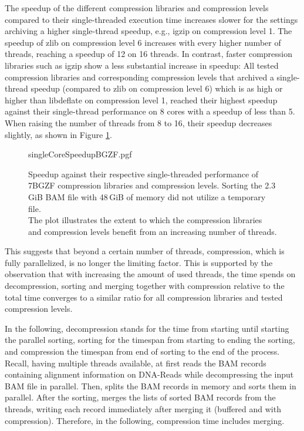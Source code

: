 The speedup of the different compression libraries and compression levels compared to their single-threaded execution time increases slower for the settings archiving a higher single-thread speedup, e.g., igzip on compression level 1. The speedup of zlib on compression level 6 increases with every higher number of threads, reaching a speedup of 12 on 16 threads. In contrast, faster compression libraries such as igzip show a less substantial increase in speedup: All tested compression libraries and corresponding compression levels that archived a single-thread speedup (compared to zlib on compression level 6) which is as high or higher than libdeflate on compression level 1, reached their highest speedup against their single-thread performance on 8 cores with a speedup of less than 5. When raising the number of threads from 8 to 16, their speedup decreases slightly, as shown in Figure \ref{fig:bgzfSngleCoreSpeedup}. 
\begin{figure}[!htb]
        {singleCoreSpeedupBGZF.pgf}
    \caption{Speedup against their respective single-threaded performance of 7BGZF compression libraries and compression levels. Sorting the 2.3\,GiB BAM file with 48\,GiB of memory did not utilize a temporary file. \parents \threads \points\\  
    The plot illustrates the extent to which the compression libraries and compression levels benefit from an increasing number of threads. }
    \label{fig:bgzfSngleCoreSpeedup}
\end{figure}

This suggests that beyond a certain number of threads, compression, which is fully parallelized, is no longer the limiting factor. This is supported by the observation that with increasing the amount of used threads, the time \sort spends on decompression, sorting and merging together with compression  relative to the total time converges to a similar ratio for all compression libraries and tested compression levels. 

In the following, decompression stands for the time from starting \sort until starting the parallel sorting, sorting for the timespan from starting to ending the sorting, and compression the timespan from end of sorting to the end of the \sort process. Recall, having multiple threads available, \sort at first reads the BAM records containing alignment information on DNA-Reads while decompressing the input BAM file in parallel. Then, \sort splits the BAM records in memory and sorts them in parallel. After the sorting, \sort merges the lists of sorted BAM records from the threads, writing each record immediately after merging it (buffered and with compression). Therefore, in the following, compression time includes merging.

